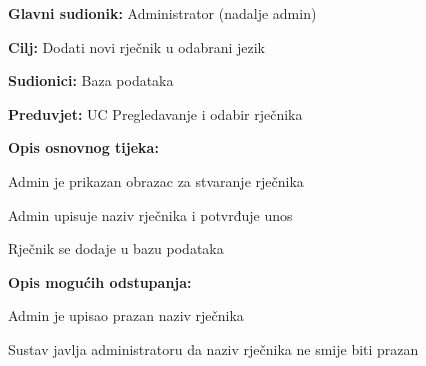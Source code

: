 \noindent {}
\begin{packed_item}

	\item \textbf{Glavni sudionik: } Administrator (nadalje admin)
	\item \textbf{Cilj: } Dodati novi rječnik u odabrani jezik
	\item \textbf{Sudionici: } Baza podataka
	\item \textbf{Preduvjet: } UC Pregledavanje i odabir rječnika
	\item  \textbf{Opis osnovnog tijeka:}
	
	\item[] \begin{packed_enum}
		
		\item Admin je prikazan obrazac za stvaranje rječnika
		\item Admin upisuje naziv rječnika i potvrđuje unos
		\item Rječnik se dodaje u bazu podataka

	\end{packed_enum}

	\item  \textbf{Opis mogućih odstupanja:}
	
	\item[] \begin{packed_item}

		\item[2.a] Admin je upisao prazan naziv rječnika
		\item[] \begin{packed_enum}
			
			\item Sustav javlja administratoru da naziv rječnika ne smije biti prazan
			
		\end{packed_enum}
		
	\end{packed_item}

\end{packed_item}

